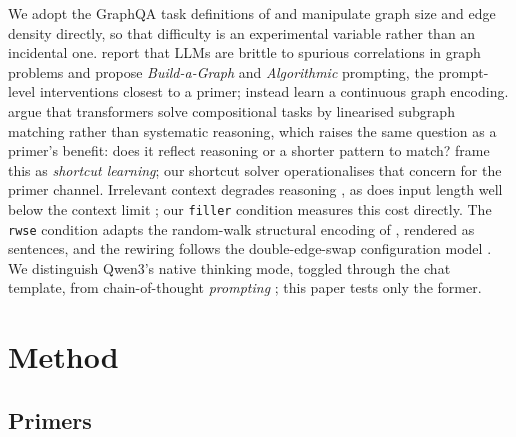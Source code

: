 \documentclass[11pt]{article}
\begin{document}
We adopt the GraphQA task definitions of \citet{fatemi2023talklikeagraph}
and manipulate graph size and edge density directly, so that difficulty is
an experimental variable rather than an incidental one.
\citet{wang2023nlgraph} report that LLMs are brittle to spurious
correlations in graph problems and propose \emph{Build-a-Graph} and
\emph{Algorithmic} prompting, the prompt-level interventions closest to a
primer; \citet{perozzi2024letyourgraph} instead learn a continuous graph
encoding. \citet{dziri2023faithandfate} argue that transformers solve
compositional tasks by linearised subgraph matching rather than systematic
reasoning, which raises the same question as a primer's benefit: does it
reflect reasoning or a shorter pattern to match?
\citet{geirhos2020shortcut} frame this as \emph{shortcut learning}; our
shortcut solver operationalises that concern for the primer channel.
Irrelevant context degrades reasoning \citep{shi2023distracted}, as does
input length well below the context limit \citep{levy2024sametask}; our
\texttt{filler} condition measures this cost directly. The \texttt{rwse}
condition adapts the random-walk structural encoding of
\citet{dwivedi2022graph}, rendered as sentences, and the rewiring follows
the double-edge-swap configuration model \citep{fosdick2018configuring}. We
distinguish Qwen3's native thinking mode, toggled through the chat
template, from chain-of-thought \emph{prompting}
\citep{wei2022chainofthought}; this paper tests only the former.

\section{Method}
\label{sec:method}

\subsection{Primers}
\label{sec:primers}
\end{document}
